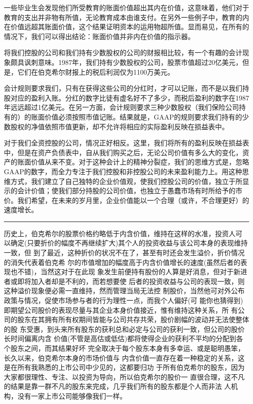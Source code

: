 \documentclass[UTF8,a4paper,zihao=-4,fontset = windows]{ctexart} %
\begin{document}
一些毕业生会发现他们所受教育的账面价值超出其内在价值，这意味着，他们对于教育的支出并非物有所值，无论教育成本由谁支付。在另外一些例子中，教育的内在价值远超其账面价值，这个结果证明资本的运用物超所值。显而易见，在所有的情况下，我们可以得出结论：账面价值并非内在价值的指示器。

将我们控股的公司和我们持有少数股权的公司的财报相比较，有一个有趣的会计现象颇具讽刺意味。1987年，我们持有少数股权的公司，股票市值超过20亿美元，但是，它们在伯克希尔财报上的税后利润仅为1100万美元。

会计规则要求我们，只有在获得这些公司的分红时，才可以记账，而不是以我们持股对应的盈利入账。分红的数字比徒有虚名好不了多少，而税后盈利的数字在1987年远远超过1亿美元。在另一方面，会计规则要求三种少数股权（我们保险公司持有的）的账面价值必须按照市值记账。结果就是，GAAP的规则要求我们持有的少数股权的净值依照市值更新，却不允许将相应的实际盈利反映在损益表中。

对于我们全资控股的公司，情况正好相反。这里，我们将所有的盈利反映在损益表中，但是在资产负债表中，自从我们购买之后，无论公司价值有多么大的变化，资产的账面价值从来不变。对于这种会计上的精神分裂症，我们的思维方式是，忽略GAAP的数字，而全力专注于我们控股和非控股公司的未来盈利能力上。用这种思维方式，我们建立了自己独特的企业价值观，使我们控股公司的价值，独立于所显示的会计价值；使我们部分持股的公司价值，也独立于愚蠢市场有时所给予的市价。我们希望，在未来的岁月里，企业价值能以一个合理（或许，不合理更好）的速度增长。

\rule{10cm}{0.4pt}

历史上，伯克希尔的股票价格约略低于内含价值，维持在这样的水准，投资人可
以确定(只要折价的幅度不再继续扩大)其个人的投资收益与该公司本身的表现维持一致，但
到了最近，这种折价的状况不在了，甚至有时还会发生溢价，折价情况的消失代表着伯克希
尔的市值增加的幅度高于内含价值增长的速度(虽然后者的表现也不错)，当然这对于在此现
象发生前便持有股份的人算是好消息，但对于新进者或即将加入者却是不利的，而若想要使
后者的投资收益与公司的表现一致，则这种溢价现象便必需一直维持，然而管理当局无法控
制股价，当然他可对外公布政策与情况，促使市场参与者的行为理性一点，而我个人偏好(可
能你也猜得到)即期望公司股价的表现尽量与其企业本身价值接近，惟有维持这种关系，所
有公司的股东在其拥有所有权期间皆能与公司共存共荣，股价剧幅的波动并无法使整体的股
东受惠，到头来所有股东的获利总和必定与公司的获利一致，但公司的股价长时间偏离内含
价值(不管是高估或低估)都将使得企业的获利不平均的分配到各个股东之间，而其结果好坏
完全取决于每个股东本身有多幸运、或是聪明愚笨，长久以来，伯克希尔本身的市场价值与
内含价值一直存在着一种稳定的关系，这是在所有我熟悉的上市公司中少见的，这都要归功
于所有伯克希尔的股东，因为大家都很理性、专注、以投资为导向，所以伯克希尔的股价一
直很合理，这不凡的结果是靠一群不凡的股东来完成，几乎我们所有的股东都是个人而非法
人机构，没有一家上市公司能够像我们一样。
\end{document}
